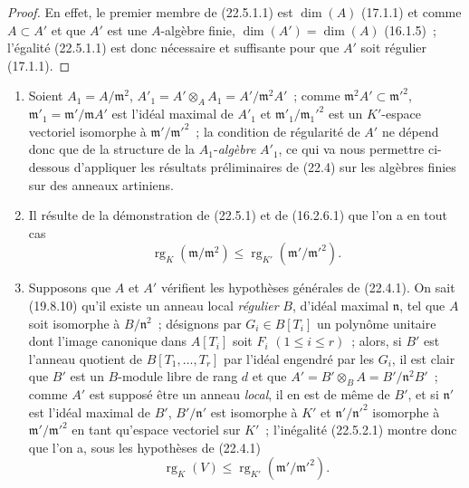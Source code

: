 \begin{proof}
En effet, le premier membre de (22.5.1.1) est $\dim(A)$ (17.1.1) et comme
$A\subset A'$ et que $A'$ est une $A$-algèbre finie,
$\dim(A')=\dim(A)$ (16.1.5)~; l'égalité (22.5.1.1) est donc nécessaire et
suffisante pour que $A'$ soit régulier (17.1.1).
\end{proof}

\begin{remarks}[22.5.2]
\label{0.22.5.2-fr}
\begin{enumerate}
  \item[\rm(i)] Soient $A_1=A/\mathfrak m^2$,
  $A'_1=A'\otimes_AA_1=A'/\mathfrak m^2A'$~; comme
  $\mathfrak m^2A'\subset\mathfrak m'^2$,
  $\mathfrak m'_1=\mathfrak m'/\mathfrak mA'$ est l'idéal maximal de $A'_1$
  et $\mathfrak m'_1/\mathfrak m_1'^2$ est un $K'$-espace vectoriel isomorphe
  à $\mathfrak m'/\mathfrak m'^2$~; la condition de régularité de $A'$ ne
  dépend donc que de la structure de la $A_1$-\emph{algèbre} $A'_1$, ce qui va nous
  permettre ci-dessous d'appliquer les résultats préliminaires de (22.4) sur
  les algèbres finies sur des anneaux artiniens.
  \item[\rm(ii)] Il résulte de la démonstration de (22.5.1) et de (16.2.6.1)
  que l'on a en tout cas
  \begin{equation}
  \label{0.22.5.2.1-fr}
    \operatorname{rg}_K(\mathfrak m/\mathfrak m^2)
    \leqslant\operatorname{rg}_{K'}(\mathfrak m'/\mathfrak m'^2).
    \tag{22.5.2.1}
  \end{equation}


  \item[\rm(iii)] Supposons que $A$ et $A'$ vérifient les hypothèses générales
  de (22.4.1). On sait (19.8.10) qu'il existe un anneau local \emph{régulier}
  $B$, d'idéal maximal $\mathfrak n$, tel que $A$ soit isomorphe à
  $B/\mathfrak n^2$~; désignons par $G_i\in B[T_i]$ un polynôme unitaire dont
  l'image canonique dans $A[T_i]$ soit $F_i$ $(1\leqslant i\leqslant r)$~;
  alors, si $B'$ est l'anneau quotient de $B[T_1,\ldots,T_r]$ par l'idéal
  engendré par les $G_i$, il est clair que $B'$ est un $B$-module libre de rang
  $d$ et que $A'=B'\otimes_BA=B'/\mathfrak n^2B'$~; comme $A'$ est supposé être
  un anneau \emph{local}, il en est de même de $B'$, et si $\mathfrak n'$ est l'idéal
  maximal de $B'$, $B'/\mathfrak n'$ est isomorphe à $K'$ et
  $\mathfrak n'/\mathfrak n'^2$ isomorphe à $\mathfrak m'/\mathfrak m'^2$ en
  tant qu'espace vectoriel sur $K'$~; l'inégalité (22.5.2.1) montre donc que
  l'on a, sous les hypothèses de (22.4.1)
  \begin{equation}
  \label{0.22.5.2.2-fr}
    \operatorname{rg}_K(V)\leqslant\operatorname{rg}_{K'}(\mathfrak m'/\mathfrak m'^2).
    \tag{22.5.2.2}
  \end{equation}
\end{enumerate}
\end{remarks}

